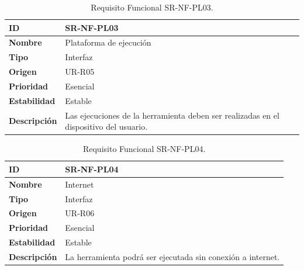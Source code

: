 \begin{center}
\begin{table}[htbp]
\centering
\begin{tabular}{@{}p{2.5cm} p{9cm}@{}} 
\toprule
\textbf{ID} 				& SR-NF-PL03 \\
\midrule
\textbf{Nombre} 			& Plataforma de ejecución \\
\midrule
\textbf{Tipo} 			& Interfaz \\
\midrule
\textbf{Origen} 			& UR-R05 \\
\midrule
\textbf{Prioridad}		& Esencial \\
\midrule
\textbf{Estabilidad} 		& Estable \\
\midrule
\textbf{Descripción} 	& Las ejecuciones de la herramienta deben ser realizadas en el dispositivo del usuario. \\
\bottomrule
\end{tabular}
\caption{Requisito Funcional SR-NF-PL03.}
\label{tab:srnfpl03}
\end{table}
\end{center}

\begin{center}
\begin{table}[htbp]
\centering
\begin{tabular}{@{}p{2.5cm} p{9cm}@{}} 
\toprule
\textbf{ID} 				& SR-NF-PL04 \\
\midrule
\textbf{Nombre} 			& Internet \\
\midrule
\textbf{Tipo} 			& Interfaz \\
\midrule
\textbf{Origen} 			& UR-R06 \\
\midrule
\textbf{Prioridad}		& Esencial \\
\midrule
\textbf{Estabilidad} 		& Estable \\
\midrule
\textbf{Descripción} 	& La herramienta podrá ser ejecutada sin conexión a internet. \\
\bottomrule
\end{tabular}
\caption{Requisito Funcional SR-NF-PL04.}
\label{tab:srnfpl04}
\end{table}
\end{center}

